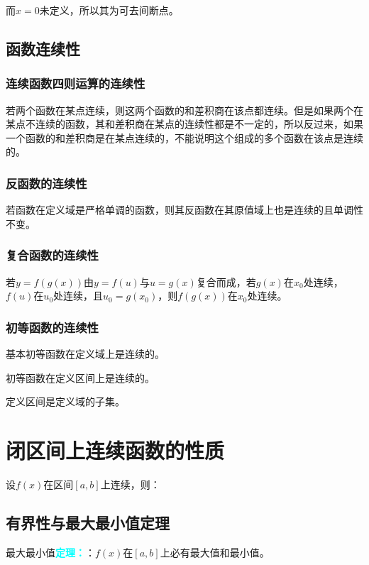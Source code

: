 \documentclass[UTF8, 12pt]{ctexart}
\begin{document}
而$x=0$未定义，所以其为可去间断点。

\subsection{函数连续性}

\subsubsection{连续函数四则运算的连续性}

若两个函数在某点连续，则这两个函数的和差积商在该点都连续。但是如果两个在某点不连续的函数，其和差积商在某点的连续性都是不一定的，所以反过来，如果一个函数的和差积商是在某点连续的，不能说明这个组成的多个函数在该点是连续的。

\subsubsection{反函数的连续性}

若函数在定义域是严格单调的函数，则其反函数在其原值域上也是连续的且单调性不变。

\subsubsection{复合函数的连续性}

若$y=f(g(x))$由$y=f(u)$与$u=g(x)$复合而成，若$g(x)$在$x_0$处连续，$f(u)$在$u_0$处连续，且$u_0=g(x_0)$，则$f(g(x))$在$x_0$处连续。

\subsubsection{初等函数的连续性}

基本初等函数在定义域上是连续的。

初等函数在定义区间上是连续的。

定义区间是定义域的子集。

\section{闭区间上连续函数的性质}

设$f(x)$在区间$[a,b]$上连续，则：

\subsection{有界性与最大最小值定理}

最大最小值\textcolor{aqua}{\textbf{定理：}}：$f(x)$在$[a,b]$上必有最大值和最小值。
\end{document}
